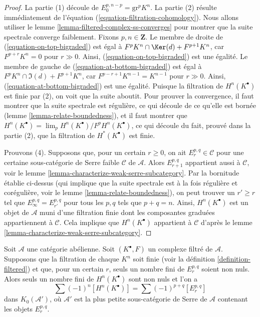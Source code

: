 \begin{proof}
La partie (1) découle de $E_0^{p, n - p} = \text{gr}^p K^n$.
La partie (2) résulte immédiatement de l'équation (\ref{equation-filtration-cohomology}).
Nous allons utiliser le lemme \ref{lemma-filtered-complex-ss-converges} pour montrer
que la suite spectrale converge faiblement. Fixons $p, n \in \mathbf{Z}$.
Le membre de droite de (\ref{equation-on-top-bigraded})
est égal à $F^pK^n \cap \Ker(d) + F^{p + 1}K^n$, car
$F^{p + r}K^n = 0$ pour $r \gg 0$. Ainsi, (\ref{equation-on-top-bigraded})
est une égalité. Le membre de gauche de (\ref{equation-at-bottom-bigraded})
est égal à $F^pK^n \cap \Im(d) + F^{p + 1}K^n$, car
$F^{p - r + 1}K^{n - 1} = K^{n - 1}$ pour $r \gg 0$.
Ainsi, (\ref{equation-at-bottom-bigraded}) est une égalité. Puisque la filtration
de $H^n(K^\bullet)$ est finie par (2), on voit que la suite aboutit.
Pour prouver la convergence, il faut montrer que la suite spectrale est
régulière, ce qui découle de ce qu'elle est bornée
(lemme \ref{lemma-relate-boundedness}), et il faut
montrer que $H^n(K^\bullet) = \lim_p H^n(K^\bullet)/F^pH^n(K^\bullet)$,
ce qui découle du fait, prouvé dans la partie (2), que la filtration de $H^*(K^\bullet)$
est finie.

\medskip\noindent
Prouvons (4). Supposons que, pour un certain $r \geq 0$, on ait
$E_r^{p, q} \in \mathcal{C}$ pour une certaine sous-catégorie de Serre faible
$\mathcal{C}$ de $\mathcal{A}$.
Alors $E_{r + 1}^{p, q}$
appartient aussi à $\mathcal{C}$, voir le
lemme \ref{lemma-characterize-weak-serre-subcategory}.
Par la bornitude établie ci-dessus (qui implique que la suite spectrale
est à la fois régulière et corégulière, voir le lemme \ref{lemma-relate-boundedness}),
on peut trouver un $r' \geq r$ tel que $E_\infty^{p, q} = E_{r'}^{p, q}$
pour tous les $p, q$ tels que $p + q = n$. Ainsi, $H^n(K^\bullet)$ est un objet
de $\mathcal{A}$ muni d'une filtration finie dont les composantes graduées
appartiennent à $\mathcal{C}$. Cela implique que $H^n(K^\bullet)$ appartient à $\mathcal{C}$
d'après le lemme \ref{lemma-characterize-weak-serre-subcategory}.
\end{proof}

\begin{lemma}
\label{lemma-biregular-ss-relation-in-K0}
Soit $\mathcal{A}$ une catégorie abélienne. Soit $(K^\bullet, F)$ un
complexe filtré de $\mathcal{A}$. Supposons que la filtration de chaque $K^n$
soit finie (voir la définition \ref{definition-filtered}) et que, pour un certain
$r$, seuls un nombre fini de $E_r^{p, q}$ soient non nuls. Alors
seuls un nombre fini de $H^n(K^\bullet)$ sont non nuls et l'on a
$$
\sum (-1)^n[H^n(K^\bullet)] = \sum (-1)^{p + q} [E_r^{p, q}]
$$
dans $K_0(\mathcal{A}')$, où $\mathcal{A}'$ est la plus petite sous-catégorie de
Serre de $\mathcal{A}$ contenant les objets
$E_r^{p, q}$.
\end{lemma}

